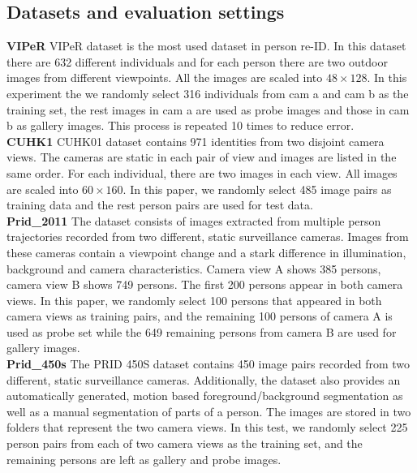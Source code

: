 \documentclass[conference,compsoc]{IEEEtran}
\begin{document}
\subsection{Datasets and evaluation settings}

\noindent \textbf{VIPeR} VIPeR dataset is the most used dataset in person re-ID. In this dataset there are 632 different individuals and for each person there are two outdoor images from different viewpoints. All the images are scaled into $48\times128$. In this experiment the we randomly select 316 individuals from cam a and cam b as the training set, the rest images in cam a are used as probe images and those in cam b as gallery images. This process is repeated 10 times to reduce error.\\
\textbf{CUHK1} CUHK01 dataset contains 971 identities from two disjoint camera views. The cameras are static in each pair of view and images are listed in the same order. For each individual, there are two images in each view. All images are scaled into $60\times160$. In this paper, we randomly select 485 image pairs as training data and the rest person pairs are used for test data. \\
\textbf{Prid\_2011} The dataset consists of images extracted from multiple person trajectories recorded from two different, static surveillance cameras. Images from these cameras contain a viewpoint change and a stark difference in illumination, background and camera characteristics. Camera view A shows 385 persons, camera view B shows 749 persons. The first 200 persons appear in both camera views. In this paper, we randomly select 100 persons that appeared in both camera views as training pairs, and the remaining 100 persons of camera A is used as probe set while the 649 remaining persons from camera B are used for gallery images. \\
\textbf{Prid\_450s} The PRID 450S dataset contains 450 image pairs recorded from two different, static surveillance cameras. Additionally, the dataset also provides an automatically generated, motion based foreground/background segmentation as well as a manual segmentation of parts of a person. The images are stored in two folders that represent the two camera views. In this test, we randomly select 225 person pairs from each of two camera views as the training set, and the remaining persons are left as gallery and probe images. \\
\end{document}
